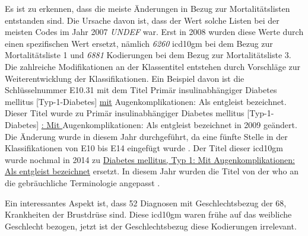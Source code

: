 Es ist zu erkennen, dass die meiste Änderungen in Bezug zur Mortalitätslisten entstanden sind. Die Ursache davon ist, dass der Wert solche Listen bei der meisten Codes im Jahr 2007 \textsl{UNDEF} war. Erst in 2008 wurden diese Werte durch einen spezifischen Wert ersetzt, nämlich \textsl{6260} \ac{icd10gm} bei dem Bezug zur Mortalitätsliste 1 und \textsl{6881} Kodierungen bei dem Bezug zur Mortalitätsliste 3. Die zahlreiche Modifikationen an der Klassentitel entstehen durch Vorschläge zur Weiterentwicklung der Klassifikationen. Ein Beispiel davon ist die Schlüsselnummer \textsf{E10.31} mit dem Titel \textsf{Primär insulinabhängiger Diabetes mellitus [Typ-1-Diabetes] \underline{mit} Augenkomplikationen: Als entgleist bezeichnet}. Dieser Titel wurde zu \textsf{Primär insulinabhängiger Diabetes mellitus [Typ-1-Diabetes] \underline{: Mit } Augenkomplikationen: Als entgleist bezeichnet} in 2009 geändert. Die Änderung wurde in diesem Jahr durchgeführt, da eine fünfte Stelle in der Klassifikationen von \textsf{E10}  bis \textsf{E14} eingefügt wurde \cite{diab09}. Der Titel dieser \ac{icd10gm} wurde nochmal in 2014 zu \textsf{\underline{Diabetes mellitus, Typ 1: Mit Augenkomplikationen: Als entgleist bezeichnet}} ersetzt. In diesem Jahr wurden die Titel von der \ac{who} an die gebräuchliche Terminologie angepasst \cite{diab14}.

Ein interessantes Aspekt ist, dass \textsf{52} Diagnosen mit Geschlechtsbezug der \textsf{68}, Krankheiten der Brustdrüse sind. Diese \ac{icd10gm} waren frühe auf das weibliche Geschlecht bezogen, jetzt ist der Geschlechtsbezug diese Kodierungen irrelevant.

